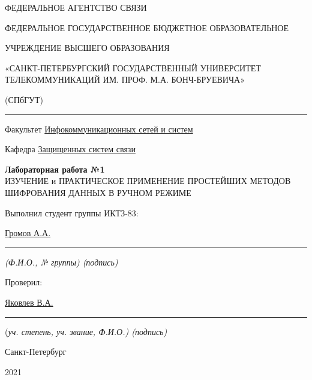 \documentclass[a4paper,14pt]{extarticle}
\begin{document}
    \begin{center}
        \thispagestyle{empty}
        \begin{singlespace}
        ФЕДЕРАЛЬНОЕ АГЕНТСТВО СВЯЗИ

        ФЕДЕРАЛЬНОЕ ГОСУДАРСТВЕННОЕ БЮДЖЕТНОЕ ОБРАЗОВАТЕЛЬНОЕ

        УЧРЕЖДЕНИЕ ВЫСШЕГО ОБРАЗОВАНИЯ

        «САНКТ-ПЕТЕРБУРГСКИЙ ГОСУДАРСТВЕННЫЙ УНИВЕРСИТЕТ ТЕЛЕКОММУНИКАЦИЙ ИМ. ПРОФ. М.А. БОНЧ-БРУЕВИЧА»

        (СПбГУТ)
        \end{singlespace}
        \vspace{-1ex}
        \rule{\textwidth}{0.4pt}
        \vspace{-5ex}

        Факультет \underline{Инфокоммуникационных сетей и систем}

        Кафедра \underline{Защищенных систем связи}
        \vspace{10ex}

        \textbf{Лабораторная работа №1}\\
        ИЗУЧЕНИЕ и ПРАКТИЧЕСКОЕ ПРИМЕНЕНИЕ ПРОСТЕЙШИХ МЕТОДОВ ШИФРОВАНИЯ ДАННЫХ В РУЧНОМ РЕЖИМЕ


    \end{center}
    \vspace{4ex}
    \begin{flushright}
    \parbox{10 cm}{
    \begin{flushleft}
        Выполнил студент группы ИКТЗ-83:

        \underline{Громов А.А.} \hfill \rule[-0.85ex]{0.1\textwidth}{0.6pt}

        \footnotesize \textit{ (Ф.И.О., № группы) \hfill (подпись)} \normalsize

        Проверил:

        \underline{Яковлев В.А.} \hfill \rule[-0.85ex]{0.1\textwidth}{0.6pt}

        (\footnotesize \textit{уч. степень, уч. звание, Ф.И.О.) \hfill (подпись)} \normalsize

    \end{flushleft}
    }
    \end{flushright}
    \begin{center}
        \vfill
        Санкт-Петербург

        2021

    \end{center}
    \newpage
\end{document}
